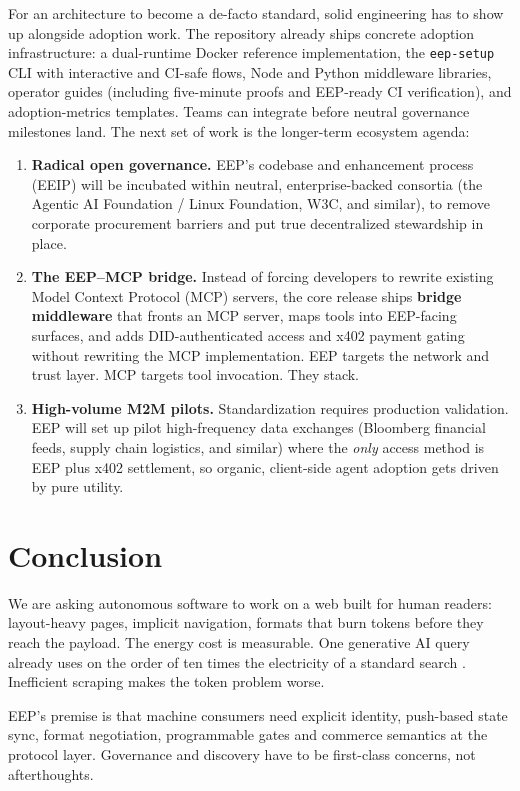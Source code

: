 \documentclass[12pt,a4paper]{article}
\begin{document}
For an architecture to become a de-facto standard, solid engineering has to show up alongside adoption work. The repository already ships concrete adoption infrastructure: a dual-runtime Docker reference implementation, the \texttt{eep-setup} CLI with interactive and CI-safe flows, Node and Python middleware libraries, operator guides (including five-minute proofs and EEP-ready CI verification), and adoption-metrics templates. Teams can integrate before neutral governance milestones land. The next set of work is the longer-term ecosystem agenda:

\begin{enumerate}
    \item \textbf{Radical open governance.} EEP's codebase and enhancement process (EEIP) will be incubated within neutral, enterprise-backed consortia (the Agentic AI Foundation / Linux Foundation, W3C, and similar), to remove corporate procurement barriers and put true decentralized stewardship in place.
    \item \textbf{The EEP--MCP bridge.} Instead of forcing developers to rewrite existing Model Context Protocol (MCP) servers, the core release ships \textbf{bridge middleware} that fronts an MCP server, maps tools into EEP-facing surfaces, and adds DID-authenticated access and x402 payment gating without rewriting the MCP implementation. EEP targets the network and trust layer. MCP targets tool invocation. They stack.
    \item \textbf{High-volume M2M pilots.} Standardization requires production validation. EEP will set up pilot high-frequency data exchanges (Bloomberg financial feeds, supply chain logistics, and similar) where the \textit{only} access method is EEP plus x402 settlement, so organic, client-side agent adoption gets driven by pure utility.
\end{enumerate}

\section{Conclusion}

We are asking autonomous software to work on a web built for human readers: layout-heavy pages, implicit navigation, formats that burn tokens before they reach the payload. The energy cost is measurable. One generative AI query already uses on the order of ten times the electricity of a standard search \cite{ref4}. Inefficient scraping makes the token problem worse.

EEP's premise is that machine consumers need explicit identity, push-based state sync, format negotiation, programmable gates and commerce semantics at the protocol layer. Governance and discovery have to be first-class concerns, not afterthoughts.
\end{document}
